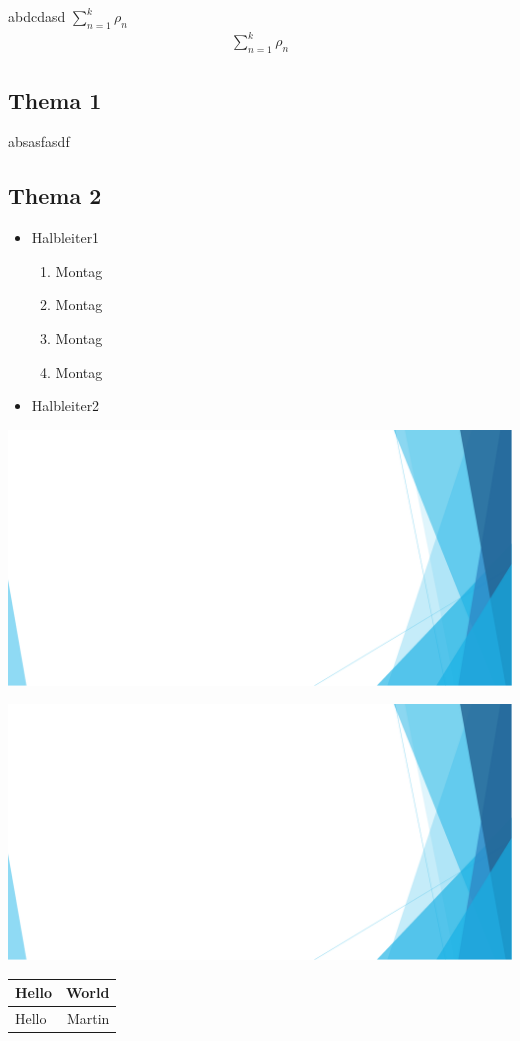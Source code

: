 abdcdasd $\sum_{n=1}^{k}\rho_n$
\begin{align*} 
	\sum_{n=1}^{k}\rho_n
\end{align*}


\subsection{Thema 1}
	absasfasdf
\subsection{Thema 2}
	
	\begin{itemize}
		\item Halbleiter1
		\begin{enumerate}
			\item Montag
			\item Montag
			\item Montag
			\item Montag
		\end{enumerate}
		\item Halbleiter2
	\end{itemize}
	\includegraphics[width=\linewidth]{Kapitel/Kap01/test.png}
	\begin{center}
		
	
		\includegraphics[width=0.4\linewidth]{Kapitel/Kap01/test.png}
	\end{center}


\begin{tabular}{|l|r|}
	\hline
	\textbf{Hello} & World\\
	\hline
	Hello & Martin\\
	\hline
\end{tabular}

